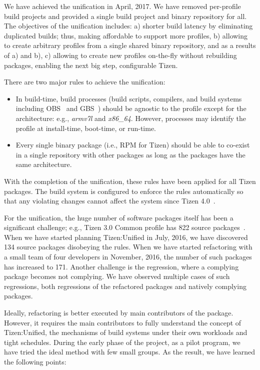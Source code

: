 We have achieved the unification in April, 2017.
We have removed per-profile build projects and provided a single build project and binary repository for all.
The objectives of the unification includes: a) shorter build latency by eliminating duplicated builds; thus, making affordable to support more profiles, b) allowing to create arbitrary profiles from a single shared binary repository, and as a results of a) and b), c) allowing to create new profiles on-the-fly without rebuilding packages, enabling the next big step, configurable Tizen.


There are two major rules to achieve the unification:
\begin{itemize}
\item In build-time, build processes (build scripts, compilers, and build systems including OBS~\cite{19OBS_URL} and GBS~\cite{17GBS2014TizenURL}) should be agnostic to the profile except for the architecture: e.g., \textit{armv7l} and \textit{x86\_64}.
However, processes may identify the profile at install-time, boot-time, or run-time.
\item Every single binary package (i.e., RPM for Tizen) should be able to co-exist in a single repository with other packages as long as the packages have the same architecture.
\end{itemize}

With the completion of the unification, these rules have been applied for all Tizen packages.
The build system is configured to enforce the rules automatically so that any violating changes cannot affect the system since Tizen 4.0~\cite{2Ham2017TDC}.


For the unification, the huge number of software packages itself has been a significant challenge; e.g., Tizen 3.0 Common profile has 822 source packages~\cite{2Ham2017TDC}.
When we have started planning Tizen:Unified in July, 2016, we have discovered 134 source packages disobeying the rules.
When we have started refactoring with a small team of four developers in November, 2016, the number of such packages has increased to 171.
Another challenge is the regression, where a complying package becomes not complying.
We have observed multiple cases of such regressions, both regressions of the refactored packages and natively complying packages.


Ideally, refactoring is better executed by main contributors of the package.
However, it requires the main contributors to fully understand the concept of Tizen:Unified, the mechanisms of build systems under their own workloads and tight schedules.
During the early phase of the project, as a pilot program, we have tried the ideal method with few small groups.
As the result, we have learned the following points:


